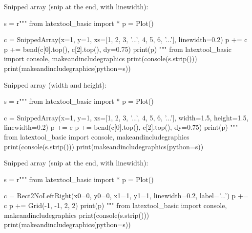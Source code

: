 \begin{samepage}
Snipped array (snip at the end, with linewidth):
\begin{python}
s = r"""
from latextool_basic import *
p = Plot()

c = SnippedArray(x=1, y=1, xs=[1, 2, 3, '...', 4, 5, 6, '...'], linewidth=0.2)
p += c
p += bend(c[0].top(), c[2].top(), dy=0.75)
print(p)
"""
from latextool_basic import console, makeandincludegraphics
print(console(s.strip()))
print(makeandincludegraphics(python=s))
\end{python}
\end{samepage}

\begin{samepage}
Snipped array (width and height):
\begin{python}
s = r"""
from latextool_basic import *
p = Plot()

c = SnippedArray(x=1, y=1, xs=[1, 2, 3, '...', 4, 5, 6, '...'], 
    width=1.5, height=1.5, linewidth=0.2)
p += c
p += bend(c[0].top(), c[2].top(), dy=0.75)
print(p)
"""
from latextool_basic import console, makeandincludegraphics
print(console(s.strip()))
print(makeandincludegraphics(python=s))
\end{python}
\end{samepage}



\begin{samepage}
Snipped array (snip at the end, with linewidth):
\begin{python}
s = r"""
from latextool_basic import *
p = Plot()

c = Rect2NoLeftRight(x0=0, y0=0, x1=1, y1=1, linewidth=0.2, label='...')
p += c
p += Grid(-1, -1, 2, 2)
print(p)
"""
from latextool_basic import console, makeandincludegraphics
print(console(s.strip()))
print(makeandincludegraphics(python=s))
\end{python}
\end{samepage}

